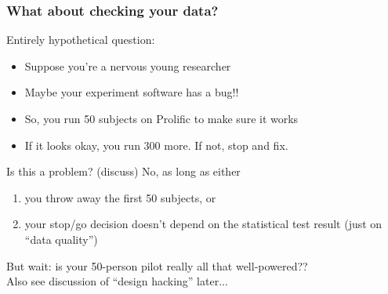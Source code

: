 \begin{frame}
\frametitle{What about checking your data?}
Entirely hypothetical question:
\begin{itemize}
    \item Suppose you're a nervous young researcher
    \item Maybe your experiment software has a bug!!
    \item So, you run 50 subjects on Prolific to make sure it works
    \item If it looks okay, you run 300 more. If not, stop and fix.
\end{itemize}
Is this a problem? (discuss)\br
\pause
No, as long as either
\begin{enumerate}
    \item you throw away the first 50 subjects, or
    \item your stop/go decision doesn't depend on the statistical test result (just on ``data quality'')
\end{enumerate}
But wait: is your 50-person pilot really all that well-powered??\\
Also see discussion of ``design hacking'' later...
\end{frame}

